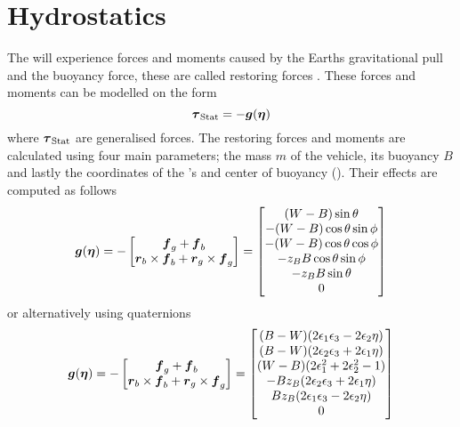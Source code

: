 \section{Hydrostatics}  
The \abbrROV will experience forces and moments caused by the Earths gravitational pull and the buoyancy force, these are called restoring forces \citep{fossen2011}. These forces and moments can be modelled on the form 
\begin{equation}\label{eq:stat}
\boldsymbol{\tau}_{\text{Stat}}=-\boldsymbol{g}(\boldsymbol{\eta}) 
\end{equation} where $\boldsymbol{\tau}_{\text{Stat}}$ are generalised forces. The restoring forces and moments are calculated using four main parameters; the mass $m$ of the vehicle, its buoyancy $B$ and lastly the coordinates of the \abbrROV's \abbrCG and center of buoyancy (\abbrCB). Their effects are computed as follows
\begin{equation} \label{eq:restoring_forces}
    \boldsymbol{g}(\boldsymbol{\eta}) = -
     \begin{bmatrix}
    \boldsymbol{f}_g + \boldsymbol{f}_b \\
    \boldsymbol{r}_b \times \boldsymbol{f}_b + \boldsymbol{r}_g \times \boldsymbol{f}_g 
     \end{bmatrix} 
     =
    \begin{bmatrix}
        (W - B) \sin \theta\\
    -(W - B) \cos \theta \sin \phi\\
    -(W - B) \cos \theta \cos \phi\\
    -z_B B \cos \theta \sin \phi\\
    -z_B B \sin \theta\\
    0\\
    \end{bmatrix}
\end{equation}
or alternatively using quaternions 
\begin{equation}\label{eq:restoring_forces_quat}
    \boldsymbol{g}(\boldsymbol{\eta}) = -
    \begin{bmatrix}
    \boldsymbol{f}_g + \boldsymbol{f}_b \\
    \boldsymbol{r}_b \times \boldsymbol{f}_b + \boldsymbol{r}_g \times \boldsymbol{f}_g 
     \end{bmatrix} = 
    \begin{bmatrix}
	(B - W) (2 \epsilon_1 \epsilon_3 - 2 \epsilon_2 \eta) 	\\
    (B - W) (2 \epsilon_2 \epsilon_3 + 2 \epsilon_1 \eta) 	\\
 	(W - B)(2 \epsilon_1^2 + 2\epsilon_2^2 - 1)				\\
 	-B z_B (2 \epsilon_2 \epsilon_3 + 2 \epsilon_1 \eta)	\\
  	B z_B (2 \epsilon_1 \epsilon_3 - 2 \epsilon_2 \eta)		\\
    0
    \end{bmatrix}
\end{equation}
